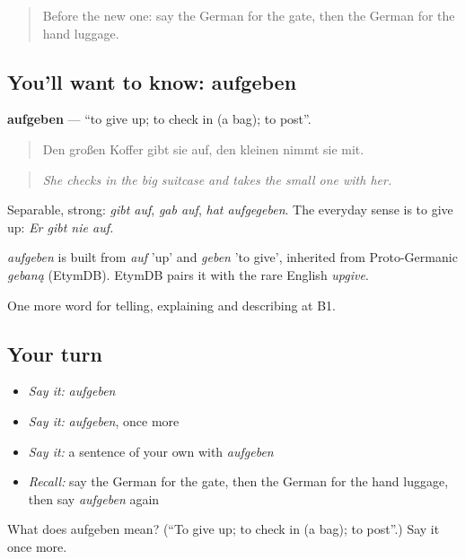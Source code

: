 \label{lesson:GE-C416-aufgeben}



\begin{quote}
Before the new one: say the German for the gate, then the German for the hand luggage.
\end{quote}

\subsection*{You'll want to know: aufgeben}
\textbf{aufgeben} — \textquotedblleft{}to give up; to check in (a bag); to post\textquotedblright{}.

\begin{quote}
Den großen Koffer gibt sie auf, den kleinen nimmt sie mit.
\end{quote}

\begin{quote}
\emph{She checks in the big suitcase and takes the small one with her.}
\end{quote}

Separable, strong: \emph{gibt auf}, \emph{gab auf}, \emph{hat aufgegeben}. The everyday sense is to give up: \emph{Er gibt nie auf.}

\begin{cousinweb}
\emph{aufgeben} is built from \emph{auf} 'up' and \emph{geben} 'to give', inherited from Proto-Germanic \emph{gebaną} (EtymDB). EtymDB pairs it with the rare English \emph{upgive}.
\end{cousinweb}

\begin{grammarlens}[title={What you've built}]
One more word for telling, explaining and describing at B1.
\end{grammarlens}

\subsection*{Your turn}
\begin{itemize}
\raggedright
  \item \emph{Say it:} \emph{aufgeben}
  \item \emph{Say it:} \emph{aufgeben}, once more
  \item \emph{Say it:} a sentence of your own with \emph{aufgeben}
  \item \emph{Recall:} say the German for the gate, then the German for the hand luggage, then say \emph{aufgeben} again
\end{itemize}

\begin{tcolorbox}[breakable,colback=teal!4,colframe=teal!35!black,title={Before you move on}]
What does aufgeben mean? (\textquotedblleft{}To give up; to check in (a bag); to post\textquotedblright{}.) Say it once more.
\end{tcolorbox}
